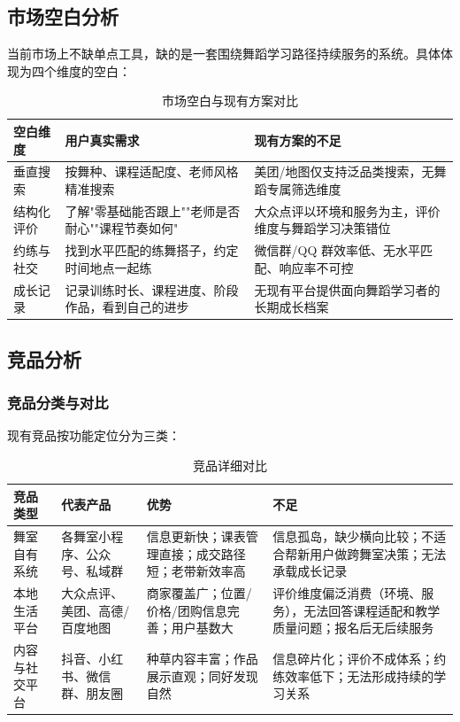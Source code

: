 \documentclass[12pt,a4paper]{ctexart}
\begin{document}
\subsection{市场空白分析}

当前市场上不缺单点工具，缺的是一套围绕舞蹈学习路径持续服务的系统。具体体现为四个维度的空白：

\begin{table}[H]
\centering
\caption{市场空白与现有方案对比}
\begin{tabularx}{\textwidth}{L{3cm}L{4cm}X}
\toprule
\textbf{空白维度} & \textbf{用户真实需求} & \textbf{现有方案的不足} \\
\midrule
垂直搜索 & 按舞种、课程适配度、老师风格精准搜索 & 美团/地图仅支持泛品类搜索，无舞蹈专属筛选维度 \\
\midrule
结构化评价 & 了解"零基础能否跟上""老师是否耐心""课程节奏如何" & 大众点评以环境和服务为主，评价维度与舞蹈学习决策错位 \\
\midrule
约练与社交 & 找到水平匹配的练舞搭子，约定时间地点一起练 & 微信群/QQ 群效率低、无水平匹配、响应率不可控 \\
\midrule
成长记录 & 记录训练时长、课程进度、阶段作品，看到自己的进步 & 无现有平台提供面向舞蹈学习者的长期成长档案 \\
\bottomrule
\end{tabularx}
\end{table}

\subsection{竞品分析}

\subsubsection{竞品分类与对比}

现有竞品按功能定位分为三类：

\begin{table}[H]
\centering
\caption{竞品详细对比}
\begin{tabularx}{\textwidth}{L{2cm}L{2.8cm}L{3cm}X}
\toprule
\textbf{竞品类型} & \textbf{代表产品} & \textbf{优势} & \textbf{不足} \\
\midrule
舞室自有系统 & 各舞室小程序、公众号、私域群 & 信息更新快；课表管理直接；成交路径短；老带新效率高 & 信息孤岛，缺少横向比较；不适合帮新用户做跨舞室决策；无法承载成长记录 \\
\midrule
本地生活平台 & 大众点评、美团、高德/百度地图 & 商家覆盖广；位置/价格/团购信息完善；用户基数大 & 评价维度偏泛消费（环境、服务），无法回答课程适配和教学质量问题；报名后无后续服务 \\
\midrule
内容与社交平台 & 抖音、小红书、微信群、朋友圈 & 种草内容丰富；作品展示直观；同好发现自然 & 信息碎片化；评价不成体系；约练效率低下；无法形成持续的学习关系 \\
\bottomrule
\end{tabularx}
\end{table}
\end{document}
